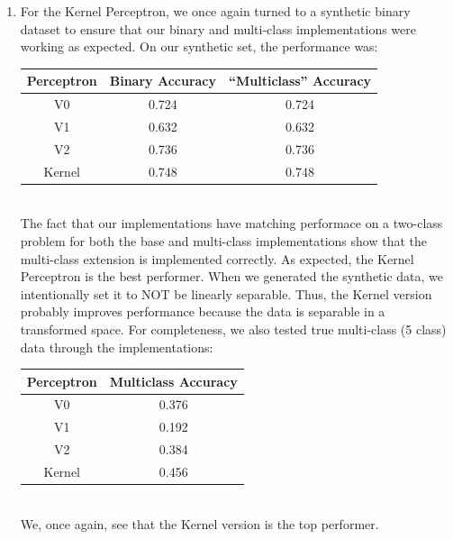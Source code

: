 \documentclass[twoside,11pt]{homework}
\DeclarePairedDelimiter{\2norm}{\lVert}{\rVert^2_2}
\newcommand{\1}[1]{\mathds{1}\left[#1\right]}
\begin{document}
\begin{enumerate}[\bf (i)]
\item For the Kernel Perceptron, we once again turned to a synthetic binary dataset to ensure that our binary and multi-class implementations were working as expected. On our synthetic set, the performance was:
\\
\begin{tabular}{|c|c|c|}
	\hline
	\textbf{Perceptron} & \textbf{Binary Accuracy} & \textbf{``Multiclass'' Accuracy}\\ \hline
	V0 & 0.724 & 0.724 \\
	V1 & 0.632 & 0.632 \\
	V2 & 0.736 & 0.736 \\
	Kernel & 0.748 & 0.748 \\ \hline
\end{tabular}
\\
The fact that our implementations have matching performace on a two-class problem for both the base and multi-class implementations show that the multi-class extension is implemented correctly. As expected, the Kernel Perceptron is the best performer. When we generated the synthetic data, we intentionally set it to NOT be linearly separable. Thus, the Kernel version probably improves performance because the data is separable in a transformed space. For completeness, we also tested true multi-class (5 class) data through the implementations:
\\
\begin{tabular}{|c|c|}
	\hline
	\textbf{Perceptron} & \textbf{Multiclass Accuracy}\\ \hline
	V0 & 0.376  \\
	V1 & 0.192  \\
	V2 & 0.384  \\
	Kernel & 0.456\\ \hline
\end{tabular}
\\
We, once again, see that the Kernel version is the top performer.
\end{enumerate}
\end{document}
